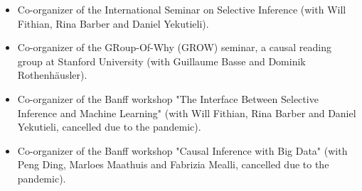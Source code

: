 \documentclass{article}
\begin{document}
\begin{itemize}
\item Co-organizer of the International Seminar on Selective Inference (with Will Fithian, Rina Barber and Daniel Yekutieli).
\item Co-organizer of the GRoup-Of-Why (GROW) seminar, a causal reading group at Stanford University (with Guillaume Basse and Dominik Rothenhäusler).
\item Co-organizer of the Banff workshop "The Interface Between Selective Inference and Machine Learning" (with Will Fithian, Rina Barber and Daniel Yekutieli, cancelled due to the pandemic).
\item Co-organizer of the Banff workshop "Causal Inference with Big Data" (with Peng Ding, Marloes Maathuis and Fabrizia Mealli, cancelled due to the pandemic).
\end{itemize}
\end{document}
